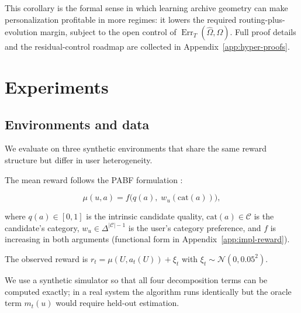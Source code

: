 \documentclass{article} %
\begin{document}
This corollary is the formal sense in which learning archive geometry can make personalization profitable in more regimes: it lowers the required routing-plus-evolution margin, subject to the open control of \(\operatorname{Err}_{T}(\widehat{\Omega},\Omega)\). Full proof details and the residual-control roadmap are collected in Appendix~\ref{app:hyper-proofs}.

\section{Experiments}

\label{sec:experiments}

\subsection{Environments and data}

\label{sec:exp-setup}

We evaluate on three synthetic environments that share the same reward structure but differ in user heterogeneity.

The mean reward follows the PABF formulation \citep{jin2026personalizing}:

\begin{equation}
\label{eq:exp-mu}
\mu(u,a) = f\bigl(q(a),\; w_u(\mathrm{cat}(a))\bigr),
\end{equation}

where $q(a)\in[0,1]$ is the intrinsic candidate quality, $\mathrm{cat}(a)\in\mathcal{C}$ is the candidate's category, $w_u\in\Delta^{|\mathcal{C}|-1}$ is the user's category preference, and $f$ is increasing in both arguments (functional form in Appendix~\ref{app:impl-reward}).

The observed reward is $r_t = \mu(U,a_t(U)) + \xi_t$ with $\xi_t \sim \mathcal{N}(0, 0.05^2)$.

We use a synthetic simulator so that all four decomposition terms can be computed exactly; in a real system the algorithm runs identically but the oracle term $m_t(u)$ would require held-out estimation.
\end{document}
